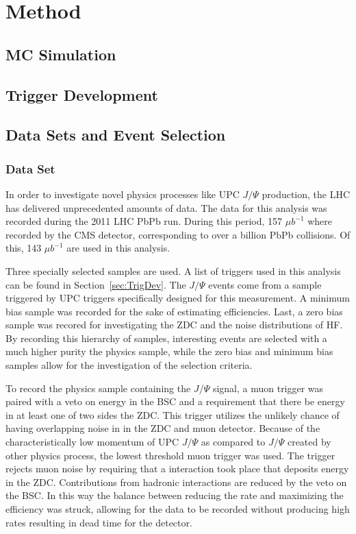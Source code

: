 \chapter{Method}	
  \section{MC Simulation}
  \section{\label{sec:TrigDev} Trigger Development} 
  \section{Data Sets and Event Selection}
  \subsection{Data Set}
    In order to investigate novel physics processes like UPC $J/\Psi$ 
     production, the LHC has delivered unprecedented amounts of data.
    The data for this analysis was recorded during the 2011 LHC PbPb run. 
    During this period, 157 $\mu$$b^{-1}$ where recorded by the CMS detector,
      corresponding to over a billion PbPb collisions. 
    Of this, 143 $\mu$$b^{-1}$ are used in this analysis.

    Three specially selected samples are used.
    A list of triggers used in this analysis can be found in 
      Section~\ref{sec:TrigDev}.
    The $J/\Psi$ events come from a sample triggered by UPC triggers 
      specifically designed for this measurement.
    A minimum bias sample was recorded for the sake of estimating efficiencies.
    Last, a zero bias sample was recored for investigating the ZDC and the 
      noise distributions of HF.
    By recording this hierarchy of samples, interesting events are selected 
      with a much higher purity the physics sample, while the zero bias and 
      minimum bias samples allow for the investigation of the selection 
      criteria. 

    To record the physics sample containing the $J/\Psi$ signal, a muon trigger
      was paired with a veto on energy in the BSC and a requirement that there 
      be energy in at least one of two sides the ZDC. 
    This trigger utilizes the unlikely chance of having overlapping noise in
      in the ZDC and muon detector.
    Because of the characteristically low momentum of UPC $J/\Psi$ as compared
      to $J/\Psi$ created by other physics process, the lowest threshold muon 
      trigger was used.
    The trigger rejects muon noise by requiring that a interaction took place
      that deposits energy in the ZDC.
    Contributions from hadronic interactions are reduced by the veto on the 
      BSC.
    In this way the balance between reducing the rate and maximizing the 
      efficiency was struck, allowing for the data to be recorded without 
      producing high rates resulting in dead time for the detector.  
    
